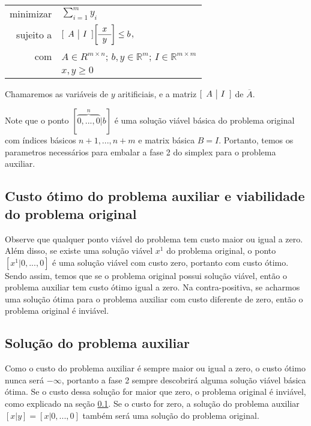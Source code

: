 \documentclass[12pt]{article}
\begin{document}
\begin{center}
	\begin{tabular}{r l}
		minimizar & $\sum_{i = 1}^{m} y_i$ \\
		sujeito a & $
					[\begin{array}{c | c}
						A & I
					\end{array}]
					
					\bigg[\begin{array}{c}
						x \\
						\hline
						y
					\end{array}\bigg]
					
					\leq b$, \\
			com   &	$A \in R^{m \times n}$; $b, y \in \mathbb{R}^m$; $I \in \mathbb{R}^{m \times m}$ \\
            & $x, y \geq 0$
	\end{tabular}
\end{center}
Chamaremos as variáveis de $y$ aritificiais, e a matriz $[\begin{array}{c | c} A & I	\end{array}]$ de $\overline{A}$.

Note que o ponto $[\overbrace{0, ..., 0}^{n}|b]$ é uma solução viável básica do problema original com índices básicos $n + 1, ..., n + m$ e matrix básica $B = I$. Portanto, temos os parametros necessários para embalar a fase 2 do simplex para o problema auxiliar.



\subsection{Custo ótimo do problema auxiliar e viabilidade do problema original}
\label{fase2:custo_otimo}
Observe que qualquer ponto viável do problema tem custo maior ou igual a zero. Além disso, se existe uma solução viável $x^1$ do problema original, o ponto $[x^1 | 0, ..., 0]$ é uma solução viável com custo zero, portanto com custo ótimo. Sendo assim, temos que se o problema original possui solução viável, então o problema auxiliar tem custo ótimo igual a zero. Na contra-positiva, se acharmos uma solução ótima para o problema auxiliar com custo diferente de zero, então o problema original é inviável.


\subsection{Solução do problema auxiliar}
Como o custo do problema auxiliar é sempre maior ou igual a zero, o custo ótimo nunca será $-\infty$, portanto a fase 2 sempre descobrirá alguma solução viável básica ótima. Se o custo dessa solução for maior que zero, o problema original é inviável, como explicado na seção \ref{fase2:custo_otimo}. Se o custo for zero, a solução do problema auxiliar $[x|y] = [x | 0, ..., 0]$ também será uma solução do problema original. 
\end{document}
